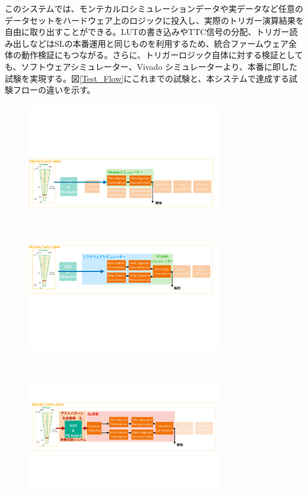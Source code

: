 このシステムでは、モンテカルロシミュレーションデータや実データなど任意のデータセットをハードウェア上のロジックに投入し、実際のトリガー演算結果を自由に取り出すことができる。LUTの書き込みやTTC信号の分配、トリガー読み出しなどはSLの本番運用と同じものを利用するため、統合ファームウェア全体の動作検証にもつながる。さらに、トリガーロジック自体に対する検証としても、ソフトウェアシミュレーター、Vivado シミュレーターより、本番に即した試験を実現する。図\ref{Test_Flow}にこれまでの試験と、本システムで達成する試験フローの違いを示す。

\begin{figure}
    \begin{minipage}[b]{0.9\linewidth}
    \centering
    \includegraphics[height=4.8cm]{fig/Test/Flow_Wire.pdf}
    \end{minipage}\\
    \begin{minipage}[b]{0.9\linewidth}
        \centering
        \includegraphics[height=4.8cm]{fig/Test/Flow_WS.pdf}
    \end{minipage}\\
        \begin{minipage}[b]{0.9\linewidth}
            \centering
            \includegraphics[height=4.8cm]{fig/Test/Flow_zikki.pdf}
        \end{minipage}\\
    

\end{figure}
